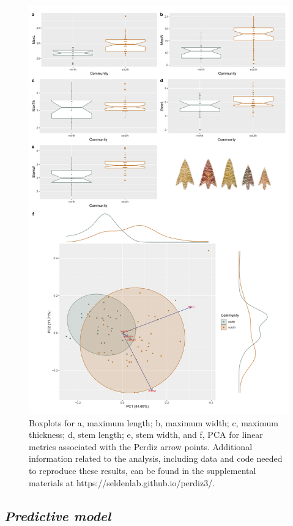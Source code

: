 \documentclass[smallextended]{svjour3}       %
\begin{document}
\begin{figure}
\includegraphics[width=0.95\linewidth]{ms-figs/figure2} \caption{Boxplots for a, maximum length; b, maximum width; c, maximum thickness; d, stem length; e, stem width, and f, PCA for linear metrics associated with the Perdiz arrow points. Additional information related to the analysis, including data and code needed to reproduce these results, can be found in the supplemental materials at https://seldenlab.github.io/perdiz3/.}\label{fig:fig2}
\end{figure}

\hypertarget{predictive-model}{%
\subsection{\texorpdfstring{\emph{Predictive
model}}{Predictive model}}\label{predictive-model}}
\end{document}
